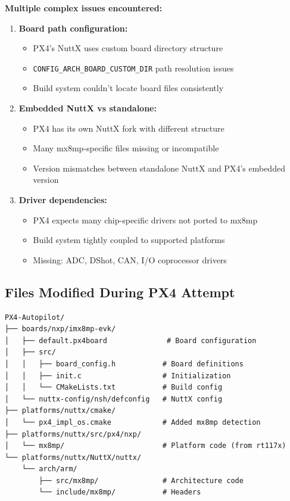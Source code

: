 \documentclass[12pt,a4paper]{report}
\begin{document}
\textbf{Multiple complex issues encountered:}

\begin{enumerate}
    \item \textbf{Board path configuration:}
    \begin{itemize}
        \item PX4's NuttX uses custom board directory structure
        \item \texttt{CONFIG\_ARCH\_BOARD\_CUSTOM\_DIR} path resolution issues
        \item Build system couldn't locate board files consistently
    \end{itemize}
    
    \item \textbf{Embedded NuttX vs standalone:}
    \begin{itemize}
        \item PX4 has its own NuttX fork with different structure
        \item Many mx8mp-specific files missing or incompatible
        \item Version mismatches between standalone NuttX and PX4's embedded version
    \end{itemize}
    
    \item \textbf{Driver dependencies:}
    \begin{itemize}
        \item PX4 expects many chip-specific drivers not ported to mx8mp
        \item Build system tightly coupled to supported platforms
        \item Missing: ADC, DShot, CAN, I/O coprocessor drivers
    \end{itemize}
 
\end{enumerate}

\subsection{Files Modified During PX4 Attempt}

\begin{verbatim}
PX4-Autopilot/
├── boards/nxp/imx8mp-evk/
│   ├── default.px4board              # Board configuration
│   ├── src/
│   │   ├── board_config.h           # Board definitions
│   │   ├── init.c                   # Initialization
│   │   └── CMakeLists.txt           # Build config
│   └── nuttx-config/nsh/defconfig   # NuttX config
├── platforms/nuttx/cmake/
│   └── px4_impl_os.cmake            # Added mx8mp detection
├── platforms/nuttx/src/px4/nxp/
│   └── mx8mp/                       # Platform code (from rt117x)
└── platforms/nuttx/NuttX/nuttx/
    └── arch/arm/
        ├── src/mx8mp/               # Architecture code
        └── include/mx8mp/           # Headers
\end{verbatim}
\end{document}
